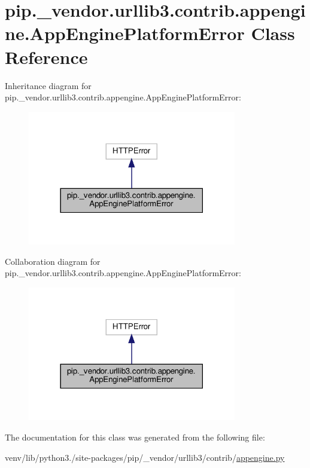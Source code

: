 \hypertarget{classpip_1_1__vendor_1_1urllib3_1_1contrib_1_1appengine_1_1AppEnginePlatformError}{}\section{pip.\+\_\+vendor.\+urllib3.\+contrib.\+appengine.\+App\+Engine\+Platform\+Error Class Reference}
\label{classpip_1_1__vendor_1_1urllib3_1_1contrib_1_1appengine_1_1AppEnginePlatformError}


Inheritance diagram for pip.\+\_\+vendor.\+urllib3.\+contrib.\+appengine.\+App\+Engine\+Platform\+Error\+:
\nopagebreak
\begin{figure}[H]
\begin{center}
\leavevmode
\includegraphics[width=258pt]{classpip_1_1__vendor_1_1urllib3_1_1contrib_1_1appengine_1_1AppEnginePlatformError__inherit__graph}
\end{center}
\end{figure}


Collaboration diagram for pip.\+\_\+vendor.\+urllib3.\+contrib.\+appengine.\+App\+Engine\+Platform\+Error\+:
\nopagebreak
\begin{figure}[H]
\begin{center}
\leavevmode
\includegraphics[width=258pt]{classpip_1_1__vendor_1_1urllib3_1_1contrib_1_1appengine_1_1AppEnginePlatformError__coll__graph}
\end{center}
\end{figure}


The documentation for this class was generated from the following file\+:\begin{DoxyCompactItemize}
\item 
venv/lib/python3./site-\/packages/pip/\+\_\+vendor/urllib3/contrib/\hyperlink{appengine_8py}{appengine.\+py}\end{DoxyCompactItemize}
